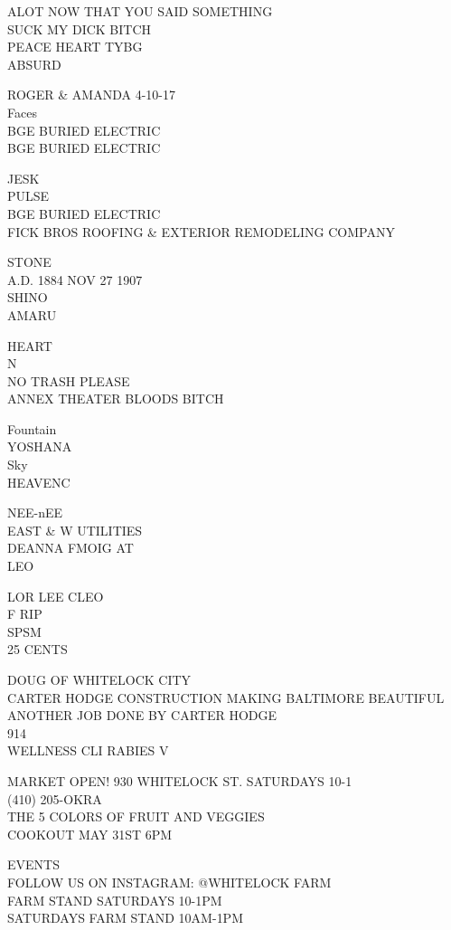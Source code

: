 \documentclass[10pt,letterpaper]{article}
\begin{document}
ALOT NOW THAT YOU SAID SOMETHING\\
SUCK MY DICK BITCH\\
PEACE HEART TYBG\\
ABSURD

ROGER \& AMANDA 4{-}10{-}17\\
Faces\\
BGE BURIED ELECTRIC\\
BGE BURIED ELECTRIC

JESK\\
PULSE\\
BGE BURIED ELECTRIC\\
FICK BROS ROOFING \& EXTERIOR REMODELING COMPANY

STONE\\
A.D. 1884 NOV 27 1907\\
SHINO\\
AMARU

HEART\\
N\\
NO TRASH PLEASE\\
ANNEX THEATER BLOODS BITCH

Fountain\\
YOSHANA\\
Sky\\
HEAVENC

NEE{-}nEE\\
EAST \& W UTILITIES\\
DEANNA FMOIG AT\\
LEO

LOR LEE CLEO\\
F RIP\\
SPSM\\
25 CENTS

DOUG OF WHITELOCK CITY\\
CARTER HODGE CONSTRUCTION MAKING BALTIMORE BEAUTIFUL ANOTHER JOB DONE BY CARTER HODGE\\
914\\
WELLNESS CLI RABIES V

MARKET OPEN! 930 WHITELOCK ST. SATURDAYS 10{-}1\\
(410) 205{-}OKRA\\
THE 5 COLORS OF FRUIT AND VEGGIES\\
COOKOUT MAY 31ST 6PM

EVENTS\\
FOLLOW US ON INSTAGRAM: @WHITELOCK FARM\\
FARM STAND SATURDAYS 10{-}1PM\\
SATURDAYS FARM STAND 10AM{-}1PM
\end{document}
